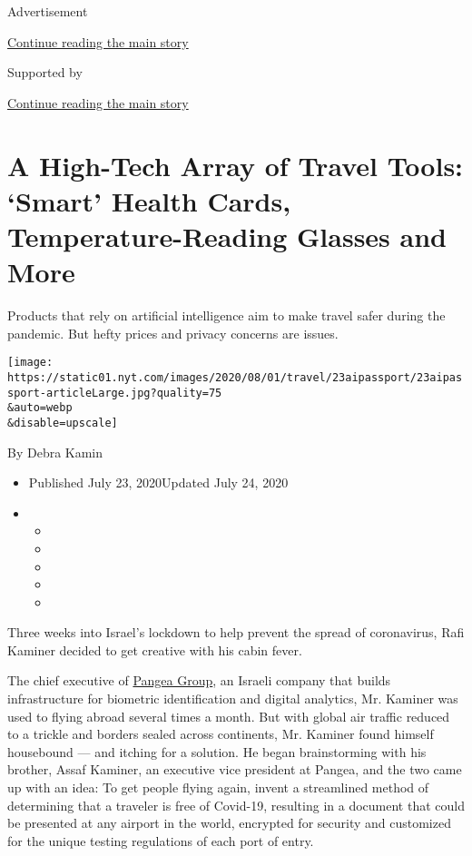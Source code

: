 Advertisement

\protect\hyperlink{after-top}{Continue reading the main story}

Supported by

\protect\hyperlink{after-sponsor}{Continue reading the main story}

\hypertarget{a-high-tech-array-of-travel-tools-smart-health-cards-temperature-reading-glasses-and-more}{%
\section{A High-Tech Array of Travel Tools: `Smart' Health Cards,
Temperature-Reading Glasses and
More}\label{a-high-tech-array-of-travel-tools-smart-health-cards-temperature-reading-glasses-and-more}}

Products that rely on artificial intelligence aim to make travel safer
during the pandemic. But hefty prices and privacy concerns are issues.

\texttt{[image: https://static01.nyt.com/images/2020/08/01/travel/23aipassport/23aipassport-articleLarge.jpg?quality=75\\\&auto=webp\\\&disable=upscale]}

By Debra Kamin

\begin{itemize}
\item
  Published July 23, 2020Updated July 24, 2020
\item
  \begin{itemize}
  \item
  \item
  \item
  \item
  \item
  \end{itemize}
\end{itemize}

Three weeks into Israel's lockdown to help prevent the spread of
coronavirus, Rafi Kaminer decided to get creative with his cabin fever.

The chief executive of \href{https://pangea-it.com/}{Pangea Group}, an
Israeli company that builds infrastructure for biometric identification
and digital analytics, Mr. Kaminer was used to flying abroad several
times a month. But with global air traffic reduced to a trickle and
borders sealed across continents, Mr. Kaminer found himself housebound
--- and itching for a solution. He began brainstorming with his brother,
Assaf Kaminer, an executive vice president at Pangea, and the two came
up with an idea: To get people flying again, invent a streamlined method
of determining that a traveler is free of Covid-19, resulting in a
document that could be presented at any airport in the world, encrypted
for security and customized for the unique testing regulations of each
port of entry.

